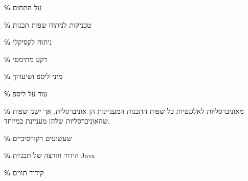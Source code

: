 \documentclass[12pt,reqno,fleqn]{book}
\begin{document}
\frontmatter
\maketitle

\mainmatter{}

℆ על התחום 

℆ טכניקות לניתוח שפות תכנות

℆ ניתוח לקסיקלי 

℆ רקע מתימטי

℆ מיני ליספ ושיערוך

℆ עוד על ליספ 

℆ מאוניברסליות לאלגנטיות 
כל שפות התכנות המעניינות הן אוניברסלית, אך ישנן שפות שהאוניברסליות שלהן מעניינת
במיוחד.

℆ שעשועים רקורסיביים  

℆ הידור והרצה של תכניות Java


℆ קידוד תווים
\end{document}
